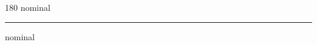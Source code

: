 
\begin{frame}
\begin{center}
\begin{turn}{180}
{\fontsize{2.5cm}{1em}\selectfont nominal}
\end{turn}
\vspace{1em}\par  
\hrule
\vspace{1em}\par  
{\fontsize{2.5cm}{1em}\selectfont nominal}
\end{center}
\end{frame}
